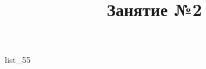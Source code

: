 \documentclass[12pt, a4paper]{article}
\begin{document}
	\title{Занятие №2}
	{list_55}
\end{document}
